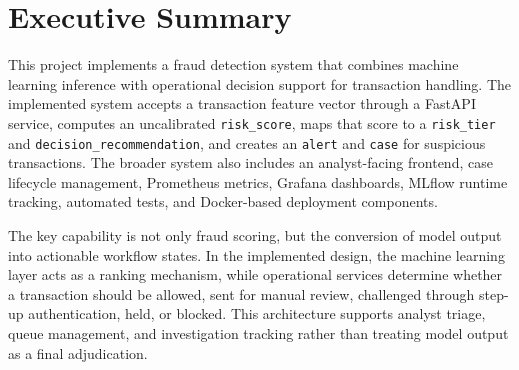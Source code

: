 \documentclass[11pt]{article}
\newcommand{\code}[1]{\texttt{#1}}
\begin{document}
\begin{abstract}
This report documents a real-time banking transaction fraud detection and decision-support system that combines machine learning scoring, threshold-based policy handling, analyst workflow management, operational monitoring, and Docker-based deployment. The deployed artifact is a logistic regression pipeline trained on the Kaggle credit card fraud dataset, with uncalibrated risk scoring and capacity-driven top-K thresholds aligned to analyst review capacity. Suspicious transactions generate alerts and cases, which are then managed through a case lifecycle and timeline model. The repository also includes a browser-based analyst dashboard, Prometheus and Grafana observability assets, MLflow runtime tracking, SQL-backed persistence support, and CI workflows with an 80\% coverage gate. In the current verification run, the test suite completed with 50 passing tests and 80\% measured source coverage. This report aligns the final LaTeX version with repository evidence, grading-rubric expectations, deployment screenshots, benchmark artifacts, and honest limitations, so that evaluators can assess both technical implementation quality and end-to-end system maturity.
\end{abstract}
\clearpage
\tableofcontents
\clearpage
\hypersetup{pageanchor=true}
\pagestyle{fancy}

\section{Executive Summary}
This project implements a fraud detection system that combines machine learning inference with operational decision support for transaction handling. The implemented system accepts a transaction feature vector through a FastAPI service, computes an uncalibrated \code{risk_score}, maps that score to a \code{risk_tier} and \code{decision_recommendation}, and creates an \code{alert} and \code{case} for suspicious transactions. The broader system also includes an analyst-facing frontend, case lifecycle management, Prometheus metrics, Grafana dashboards, MLflow runtime tracking, automated tests, and Docker-based deployment components.

The key capability is not only fraud scoring, but the conversion of model output into actionable workflow states. In the implemented design, the machine learning layer acts as a ranking mechanism, while operational services determine whether a transaction should be allowed, sent for manual review, challenged through step-up authentication, held, or blocked. This architecture supports analyst triage, queue management, and investigation tracking rather than treating model output as a final adjudication.
\end{document}

